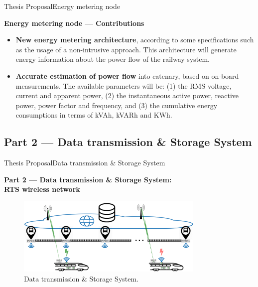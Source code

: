 \begin{frame}{Thesis Proposal}{Energy metering node}
\begin{block}{\textbf{Energy metering node --- Contributions}}
		\begin{itemize}
			\item \textbf{New energy metering architecture}, according to some specifications such as the usage of a non-intrusive approach.
			This architecture will generate energy information about the power flow of the railway system.
			
			\item \textbf{Accurate estimation of power flow} into catenary, based on on-board measurements. The available parameters will be: (1) the RMS voltage, current and apparent power, (2) the instantaneous active power, reactive power, power factor and frequency, and (3) the cumulative energy consumptions in terms of kVAh, kVARh and KWh.
		\end{itemize}
\end{block}
\end{frame}


\subsection{Part 2 --- Data transmission \& Storage System}


\begin{frame}{Thesis Proposal}{Data transmission \& Storage System}
\begin{block}{\textbf{Part 2 --- Data transmission \& Storage System: \\ \small{RTS wireless network}}}
\begin{figure}[ht!]
	\centering
	\includegraphics[width=0.8\textwidth,keepaspectratio]{figures/40.Method/arch2}
	\caption{Data transmission \& Storage System.}
\end{figure}
\end{block}
\end{frame}

